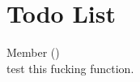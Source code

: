 \chapter{Todo List}
\hypertarget{todo}{}\label{todo}

\begin{DoxyRefList}
\item[Member \doxylink{class_h_a_l_a2cc043eef9d7028003bb3cae9a7020d7}{HAL\+::\+\_\+key\+Scan} ()]\hfill \\
\label{todo__todo000001}%
%
test this fucking function. 
\end{DoxyRefList}